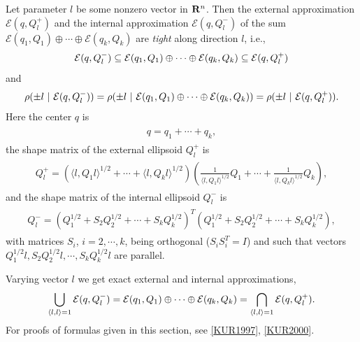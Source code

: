 \documentclass[letterpaper,10pt,english]{sphinxmanual}
\begin{document}
Let parameter $l$ be some nonzero vector in ${\bf R}^n$.
Then the external approximation ${\mathcal E}(q,Q_l^+)$ and the
internal approximation ${\mathcal E}(q,Q_l^-)$ of the sum
${\mathcal E}(q_1,Q_1)\oplus\cdots\oplus{\mathcal E}(q_k,Q_k)$ are
\emph{tight} along direction $l$, i.e.,
\begin{gather}
\begin{split}{\mathcal E}(q,Q_l^-)\subseteq{\mathcal E}(q_1,Q_1)\oplus\cdots\oplus{\mathcal E}(q_k,Q_k)
\subseteq{\mathcal E}(q,Q_l^+)\end{split}\notag
\end{gather}
and
\begin{gather}
\begin{split}\rho(\pm l ~|~ {\mathcal E}(q,Q_l^-)) =
\rho(\pm l ~|~ {\mathcal E}(q_1,Q_1)\oplus\cdots\oplus{\mathcal E}(q_k,Q_k)) =
\rho(\pm l ~|~ {\mathcal E}(q,Q_l^+)).\end{split}\notag
\end{gather}
Here the center $q$ is
\label{main_source:equation-minksum_c}\begin{gather}
\begin{split}q = q_1 + \cdots + q_k ,\end{split}\label{main_source-minksum_c}
\end{gather}
the shape matrix of the external ellipsoid $Q_l^+$ is
\label{main_source:equation-minksum_ea}\begin{gather}
\begin{split}Q_l^+ = \left(\langle l,Q_1l\rangle^{1/2} + \cdots
+ \langle l,Q_kl\rangle^{1/2}\right)
\left(\frac{1}{\langle l,Q_1l\rangle^{1/2}}Q_1 + \cdots +
\frac{1}{\langle l,Q_kl\rangle^{1/2}}Q_k\right),\end{split}\label{main_source-minksum_ea}
\end{gather}
and the shape matrix of the internal ellipsoid $Q_l^-$ is
\label{main_source:equation-minksum_ia}\begin{gather}
\begin{split}Q_l^- = \left(Q_1^{1/2} + S_2Q_2^{1/2} + \cdots + S_kQ_k^{1/2}\right)^T
\left(Q_1^{1/2} + S_2Q_2^{1/2} + \cdots + S_kQ_k^{1/2}\right),\end{split}\label{main_source-minksum_ia}
\end{gather}
with matrices $S_i$, $i=2,\cdots,k$, being orthogonal
($S_iS_i^T=I$) and such that vectors
$Q_1^{1/2}l, S_2Q_2^{1/2}l, \cdots, S_kQ_k^{1/2}l$ are parallel.

Varying vector $l$ we get exact external and internal
approximations,
\begin{gather}
\begin{split}\bigcup_{\langle l,l\rangle=1} {\mathcal E}(q,Q_l^-) =
{\mathcal E}(q_1,Q_1)\oplus\cdots\oplus{\mathcal E}(q_k,Q_k) =
\bigcap_{\langle l,l\rangle=1} {\mathcal E}(q,Q_l^+) .\end{split}\notag
\end{gather}
For proofs of formulas given in this section, see {\hyperref[main_source:kur1997]{{[}KUR1997{]}}}, {\hyperref[main_source:kur2000]{{[}KUR2000{]}}}.
\end{document}
